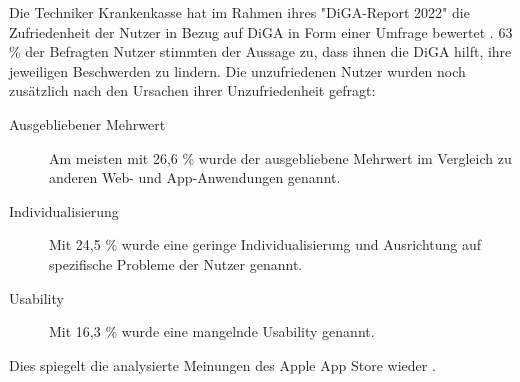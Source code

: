 \documentclass{article}
\begin{document}
			Die Techniker Krankenkasse hat im Rahmen ihres "DiGA-Report 2022" die Zufriedenheit der Nutzer in Bezug auf DiGA in Form einer Umfrage bewertet \cite{TK-diga-report-1}. 63 \% der Befragten Nutzer stimmten der Aussage zu, dass ihnen die DiGA hilft, ihre jeweiligen Beschwerden zu lindern. Die unzufriedenen Nutzer wurden noch zusätzlich nach den Ursachen ihrer Unzufriedenheit gefragt:
			\begin{description}
				\item[Ausgebliebener Mehrwert] Am meisten mit 26,6 \% wurde der ausgebliebene Mehrwert im Vergleich zu anderen Web- und App-Anwendungen genannt.
				\item[Individualisierung] Mit 24,5 \% wurde eine geringe Individualisierung und Ausrichtung auf spezifische Probleme der Nutzer genannt.
				\item[Usability] Mit 16,3 \% wurde eine mangelnde Usability genannt.    
			\end{description}
			Dies spiegelt die analysierte Meinungen des Apple App Store wieder \cite{frauenhofinstitut}.                 
\end{document}

